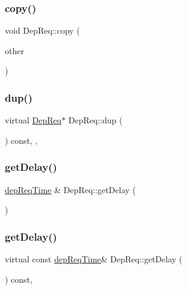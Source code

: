 \subsubsection{\texorpdfstring{copy()}{copy()}}
{\footnotesize\ttfamily void Dep\+Req\+::copy (\begin{DoxyParamCaption}\item[{const \hyperlink{classDepReq}{Dep\+Req} \&}]{other }\end{DoxyParamCaption})\hspace{0.3cm}{\ttfamily [private]}}

\mbox{\label{classDepReq_a430632dbd4f70a3a1183f226f0484bf3}} 
\subsubsection{\texorpdfstring{dup()}{dup()}}
{\footnotesize\ttfamily virtual \hyperlink{classDepReq}{Dep\+Req}$\ast$ Dep\+Req\+::dup (\begin{DoxyParamCaption}{ }\end{DoxyParamCaption}) const\hspace{0.3cm}{\ttfamily [inline]}, {\ttfamily [override]}, {\ttfamily [virtual]}}

\mbox{\label{classDepReq_a42fa35b3ced2cd9a4afd0ddeade48c19}} 
\subsubsection{\texorpdfstring{get\+Delay()}{getDelay()}\hspace{0.1cm}{\footnotesize\ttfamily [1/2]}}
{\footnotesize\ttfamily \hyperlink{depReq__m_8h_ae16a4057335e3a89fda3f6019868733b}{dep\+Req\+Time} \& Dep\+Req\+::get\+Delay (\begin{DoxyParamCaption}{ }\end{DoxyParamCaption})\hspace{0.3cm}{\ttfamily [virtual]}}

\mbox{\label{classDepReq_a3f686e18997f1383d0670a271d45a37b}} 
\subsubsection{\texorpdfstring{get\+Delay()}{getDelay()}\hspace{0.1cm}{\footnotesize\ttfamily [2/2]}}
{\footnotesize\ttfamily virtual const \hyperlink{depReq__m_8h_ae16a4057335e3a89fda3f6019868733b}{dep\+Req\+Time}\& Dep\+Req\+::get\+Delay (\begin{DoxyParamCaption}{ }\end{DoxyParamCaption}) const\hspace{0.3cm}{\ttfamily [inline]}, {\ttfamily [virtual]}}

